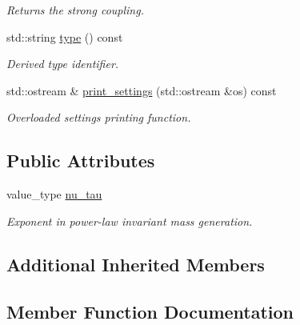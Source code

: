 \begin{DoxyCompactItemize}
\begin{DoxyCompactList}\small\item\em Returns the strong coupling. \end{DoxyCompactList}\item 
\hypertarget{a00259_a42bf9e4defb01805c9d591d5c011a56c}{}std\+::string \hyperlink{a00259_a42bf9e4defb01805c9d591d5c011a56c}{type} () const \label{a00259_a42bf9e4defb01805c9d591d5c011a56c}

\begin{DoxyCompactList}\small\item\em Derived type identifier. \end{DoxyCompactList}\item 
\hypertarget{a00259_a9c2dbca84f1612729128d0727899ef46}{}std\+::ostream \& \hyperlink{a00259_a9c2dbca84f1612729128d0727899ef46}{print\+\_\+settings} (std\+::ostream \&os) const \label{a00259_a9c2dbca84f1612729128d0727899ef46}

\begin{DoxyCompactList}\small\item\em Overloaded settings printing function. \end{DoxyCompactList}\end{DoxyCompactItemize}
\subsection*{Public Attributes}
\begin{DoxyCompactItemize}
\item 
\hypertarget{a00259_a1aa104775ec464a6cc8feec1be785142}{}value\+\_\+type \hyperlink{a00259_a1aa104775ec464a6cc8feec1be785142}{nu\+\_\+tau}\label{a00259_a1aa104775ec464a6cc8feec1be785142}

\begin{DoxyCompactList}\small\item\em Exponent in power-\/law invariant mass generation. \end{DoxyCompactList}\end{DoxyCompactItemize}
\subsection*{Additional Inherited Members}


\subsection{Member Function Documentation}
\hypertarget{a00259_a98f349a841c9177ead3c3d84d4262eee}{}
